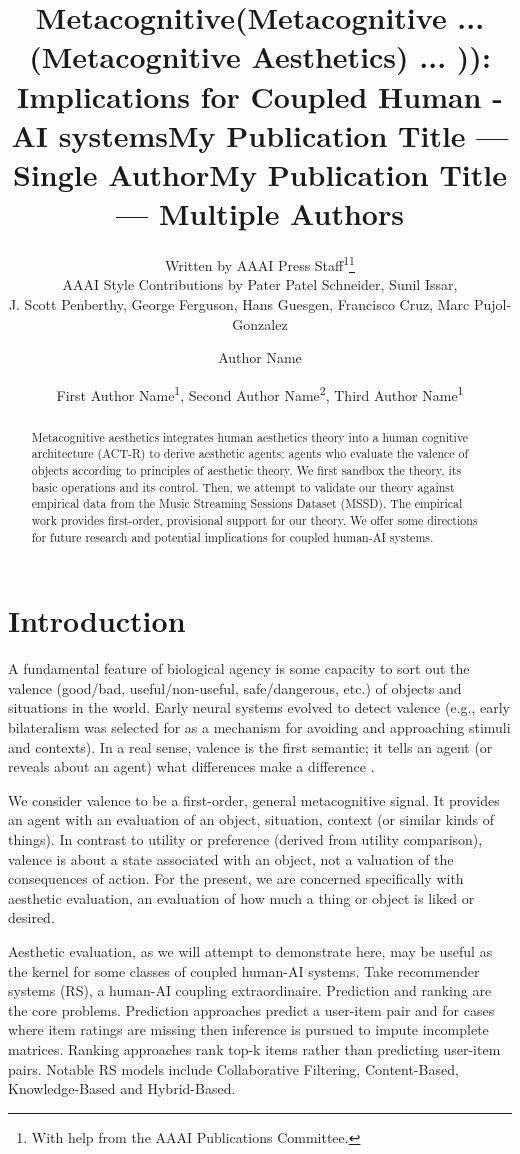 \documentclass[letterpaper]{article} %
\title{Metacognitive(Metacognitive ... (Metacognitive Aesthetics) ... )): \\Implications for Coupled Human - AI systems}
\author{
    Written by AAAI Press Staff\textsuperscript{\rm 1}\thanks{With help from the AAAI Publications Committee.}\\
    AAAI Style Contributions by Pater Patel Schneider,
    Sunil Issar,\\
    J. Scott Penberthy,
    George Ferguson,
    Hans Guesgen,
    Francisco Cruz\equalcontrib,
    Marc Pujol-Gonzalez\equalcontrib
}
\title{My Publication Title --- Single Author}
\author {
    Author Name
}
\title{My Publication Title --- Multiple Authors}
\author {
    First Author Name\textsuperscript{\rm 1},
    Second Author Name\textsuperscript{\rm 2},
    Third Author Name\textsuperscript{\rm 1}
}
\begin{document}
\maketitle

\begin{abstract}
Metacognitive aesthetics integrates human aesthetics theory into a human cognitive architecture (ACT-R) to derive aesthetic agents; agents who evaluate the valence of objects according to principles of aesthetic theory.  We first sandbox the theory, its basic operations and its control.  Then, we attempt to validate our theory against empirical data from the Music Streaming Sessions Dataset (MSSD). The empirical work provides first-order, provisional support for our theory.  We offer some directions for future research and potential implications for coupled human-AI systems.  
\end{abstract}

\section{Introduction}
A fundamental feature of biological agency is some capacity to sort out the valence (good/bad, useful/non-useful, safe/dangerous, etc.) of objects and situations in the world.  Early neural systems evolved to detect valence (e.g., early bilateralism was selected for as a mechanism for avoiding and approaching stimuli and contexts).  In a real sense, valence is the first semantic; it tells an agent (or reveals about an agent) what differences make a difference \cite{dennett2017bacteria}.  

We consider valence to be a first-order, general metacognitive signal.  It provides an agent with an evaluation of an object, situation, context (or similar kinds of things).  In contrast to utility or preference (derived from utility comparison), valence is about a state associated with an object, not a valuation of the consequences of action.   For the present, we are concerned specifically with aesthetic evaluation, an evaluation of how much a thing or object is liked or desired.  

Aesthetic evaluation, as we will attempt to demonstrate here, may be useful as the kernel for some classes of coupled human-AI systems.  Take recommender systems (RS), a human-AI coupling extraordinaire. 
Prediction and ranking are the core problems. Prediction approaches predict a user-item pair and for cases where item ratings are missing then inference is pursued to impute incomplete matrices. Ranking approaches rank top-k items rather than predicting user-item pairs. Notable RS models include Collaborative Filtering, Content-Based, Knowledge-Based and Hybrid-Based. \cite{aggarwal2016model}
\end{document}
